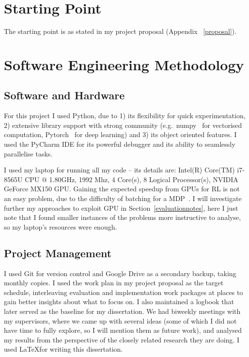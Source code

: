 \section{Starting Point}

The starting point is as stated in my project proposal (Appendix ~\ref{proposal}). 


\section{Software Engineering Methodology}





\subsection{Software and Hardware}


For this project I used Python, due to 1) its flexibility for quick experimentation, 2) extensive library support with strong community (e.g.\ numpy~\cite{harris2020numpy} for vectorised computation, Pytorch~\cite{paszke2019pytorch} for deep learning) and 3) its object oriented features. I used the PyCharm IDE for its powerful debugger and its ability to seamlessly parallelise tasks.


I used my laptop for running all my code -- its details are: Intel(R) Core(TM) i7-8565U CPU @ 1.80GHz, 1992 Mhz, 4 Core(s), 8 Logical Processor(s), NVIDIA GeForce MX150 GPU. Gaining the expected speedup from GPUs for RL is not an easy problem, due to the difficulty of batching for a MDP~\cite{stooke2018gpudeepRL}. I will investigate further my approaches to exploit GPU in Section~\ref{evaluationnotes}, here I just note that I found smaller instances of the problems more instructive to analyse, so my laptop's resources were enough.


\subsection{Project Management}

I used Git for version control and Google Drive as a secondary backup, taking monthly copies. I used the work plan in my project proposal as the target schedule, interleaving evaluation and implementation work packages at places to gain better insights about what to focus on. I also maintained a logbook that later served as the baseline for my dissertation. We had biweekly meetings with my supervisors, where we came up with several ideas (some of which I did not have time to fully explore, so I will mention them as future work), and analysed my results from the perspective of the closely related research they are doing. I used \LaTeX for writing this dissertation.

